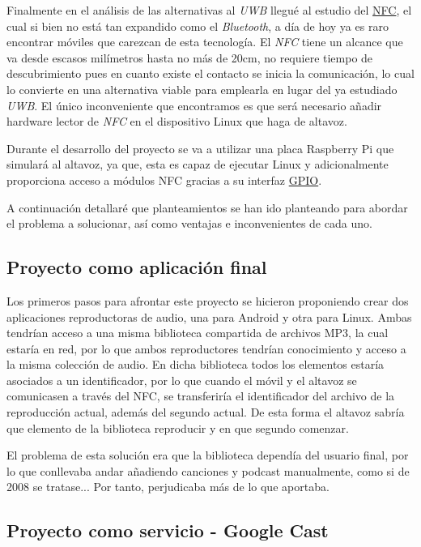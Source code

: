 Finalmente en el análisis de las alternativas al \emph{UWB} llegué al estudio
del \href{https://es.wikipedia.org/wiki/Comunicaci%C3%B3n_de_campo_cercano}{NFC}, 
el cual si bien no está tan expandido como el \emph{Bluetooth}, a día de hoy ya es raro
encontrar móviles que carezcan de esta tecnología. El \emph{NFC} tiene un alcance que
va desde escasos milímetros hasta no más de 20cm, no requiere tiempo de
descubrimiento pues en cuanto existe el contacto se inicia la comunicación, lo
cual lo convierte en una alternativa viable para emplearla en lugar del ya
estudiado \emph{UWB}. El único inconveniente que encontramos es que será
necesario añadir hardware lector de \emph{NFC} en el dispositivo Linux que haga de
altavoz.

Durante el desarrollo del proyecto se va a utilizar una placa Raspberry Pi que
simulará al altavoz, ya que, esta es capaz de ejecutar Linux y adicionalmente
proporciona acceso a módulos NFC gracias a su interfaz
\href{https://es.wikipedia.org/wiki/GPIO}{GPIO}.


A continuación detallaré que planteamientos se han ido planteando para abordar el
problema a solucionar, así como ventajas e inconvenientes de cada uno.

\subsection{Proyecto como aplicación final}

Los primeros pasos para afrontar este proyecto se hicieron proponiendo crear dos
aplicaciones reproductoras de audio, una para Android y otra para Linux. Ambas
tendrían acceso a una misma biblioteca compartida de archivos MP3, la cual
estaría en red, por lo que ambos reproductores tendrían conocimiento y acceso a
la misma colección de audio. En dicha biblioteca todos los elementos estaría
asociados a un identificador, por lo que cuando el móvil y el altavoz se
comunicasen a través del NFC, se transferiría el identificador del archivo de la
reproducción actual, además del segundo actual. De esta forma el altavoz sabría
que elemento de la biblioteca reproducir y en que segundo comenzar.

El problema de esta solución era que la biblioteca dependía del usuario final,
por lo que conllevaba andar añadiendo canciones y podcast manualmente, como si
de 2008 se tratase... Por tanto, perjudicaba más de lo que aportaba.

\subsection{Proyecto como servicio - Google Cast}

